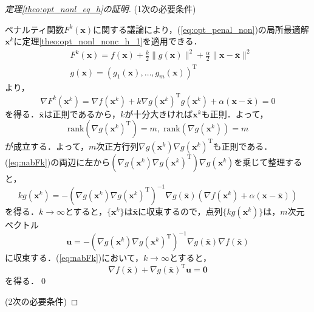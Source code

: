 \documentclass[dvipdfmx]{jsreport}
\begin{document}
\begin{proof}[定理\ref{theo:opt_nonl_eq_h}の証明]

(1次の必要条件)

ペナルティ関数$F^k(\bm{x})$に関する議論により，(\ref{eq:opt_penal_non})の局所最適解$\bm{x}^k$に定理\ref{theo:opt_nonl_nonc_h_1}を適用できる．
\begin{align}
  &F^k(\bm{x}) = f(\bm{x}) + \frac{k}{2} \|g(\bm{x})\|^2 + \frac{\alpha}{2} \|\bm{x} - \bar{\bm{x}}\|^2 \nonumber \\
  &g(\bm{x}) = (g_1(\bm{x}), \ldots, g_m(\bm{x}))^{\mathrm{T}} \nonumber
\end{align}
より，
\begin{equation}\label{eq:nabFk}
  \nabla F^k(\bm{x}^k) = \nabla f(\bm{x}^k) + k \nabla g(\bm{x}^k)^{\mathrm{T}} g(\bm{x}^k) + \alpha (\bm{x} - \bar{\bm{x}}) = 0
\end{equation}
を得る．$\bar{\bm{x}}$は正則であるから，$k$が十分大きければ$\bm{x}^k$も正則．よって，
\begin{equation}
  \mathrm{rank}(\nabla g(\bm{x}^k)^{\mathrm{T}}) = m, \; \mathrm{rank}(\nabla g(\bm{x}^k)) = m \nonumber
\end{equation}
が成立する．よって，$m$次正方行列$\nabla g(\bm{x}^k) \nabla g(\bm{x}^k)^{\mathrm{T}}$も正則である．(\ref{eq:nabFk})の両辺に左から$(\nabla g(\bm{x}^k) \nabla g(\bm{x}^k)^{\mathrm{T}})\nabla g(\bm{x}^k)$を乗じて整理すると，
\begin{equation}
  k g(\bm{x}^k) = -(\nabla g(\bm{x}^k) \nabla g(\bm{x}^k)^{\mathrm{T}})^{-1} \nabla g(\bar{\bm{x}})(\nabla f(\bm{x}^k) + \alpha (\bm{x} - \bar{\bm{x}})) \nonumber
\end{equation}
を得る．$k \rightarrow \infty$とすると，$\{\bm{x}^k\}$は$\bar{\bm{x}}$に収束するので，点列$\{k g(\bm{x}^k)\}$は，$m$次元ベクトル
\begin{equation}
  \bm{u} = -(\nabla g(\bm{x}^k) \nabla g(\bm{x}^k)^{\mathrm{T}})^{-1} \nabla g(\bar{\bm{x}}) \nabla f(\bar{\bm{x}}) \nonumber
\end{equation}
に収束する．(\ref{eq:nabFk})において，$k \rightarrow \infty$とすると，
\begin{equation}
  \nabla f(\bar{\bm{x}}) + \nabla g(\bar{\bm{x}})^{\mathrm{T}} \bm{u} = \bm{0} \nonumber
\end{equation}
を得る．\qed

(2次の必要条件)


\end{proof}
\end{document}
